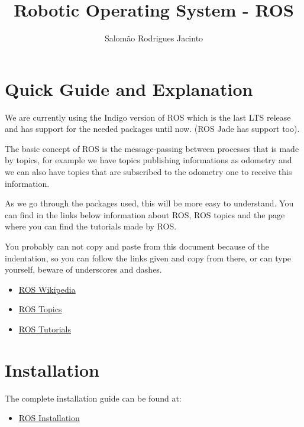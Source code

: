 \documentclass{article}
\title{Robotic Operating System - ROS}
\author{Salomão Rodrigues Jacinto}
\begin{document}
\maketitle

\section{Quick Guide and Explanation}
We are currently using the Indigo version of ROS which is the last LTS release
and has support for the needed packages until now. (ROS Jade has support too).

The basic concept of ROS is the message-passing between processes that is made
by topics, for example we have topics publishing informations as odometry and we
can also have topics that are subscribed to the odometry one to receive this
information.

As we go through the packages used, this will be more easy to understand. You
can find in the links below information about ROS, ROS topics and the page where
you can find the tutorials made by ROS.

You probably can not copy and paste from this document because of the indentation,
so you can follow the links given and copy from there, or can type yourself,
beware of underscores and dashes.

\begin{itemize}
\item \href{https://en.wikipedia.org/wiki/Robot_Operating_System}{ROS Wikipedia}
\item \href{http://wiki.ros.org/ROS/Tutorials/UnderstandingTopics}{ROS Topics}
\item \href{http://wiki.ros.org/ROS/Tutorials}{ROS Tutorials}
\end{itemize}


\section{Installation}
The complete installation guide can be found at:
\begin{itemize}
\item \href{http://wiki.ros.org/indigo/Installation/Ubuntu}{ROS Installation}
\end{itemize}
\end{document}
